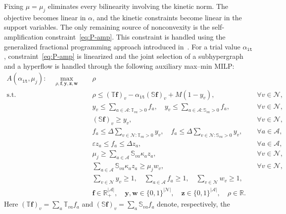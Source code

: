 \documentclass[a4paper,11pt,reqno]{amsart}
\begin{document}
Fixing $\mu=\mu_j$ eliminates every bilinearity involving the kinetic norm.
The objective becomes linear in $\alpha$, and the kinetic constraints become
linear in the support variables. The only remaining source of nonconvexity is
the self-amplification constraint~\eqref{eq:P-amp}. This constraint is handled
using the generalized fractional programming approach introduced
in~\cite{crouzeix1985,gonzalez2024maf}. For a
trial value $\alpha_{\texttt{it}}$, constraint~\eqref{eq:P-amp} is linearized
and the joint selection of a subhypergraph and a hyperflow is handled through
the following auxiliary max--min MILP:
\begin{align}
  A(\alpha_{\texttt{it}},\mu_j):\quad
  \max_{\rho,\mathbf f,\mathbf y,\mathbf z,\mathbf w}\quad
  & \rho
    \label{eq:milp-aux}\\
  \text{s.t.}\quad
  & \rho \le
    (\mathbb T\mathbf f)_v
    -\alpha_{\texttt{it}}(\mathbb S\mathbf f)_v
    +M(1-y_v),
    && \forall v\in\mathcal N,
    \label{eq:aux-maximin}\\[1pt]
  & y_v \le
    \sum_{a\in\mathcal A:\mathbb T_{va}>0} f_a,\quad
    y_v \le
    \sum_{a\in\mathcal A:\mathbb S_{va}>0} f_a,
    && \forall v\in\mathcal N,
    \nonumber\\[1pt]
  & (\mathbb S\mathbf f)_v \ge y_v,
    && \forall v\in\mathcal N,
    \nonumber\\[1pt]
  & f_a \le
    \Delta\sum_{v\in\mathcal N:\mathbb T_{va}>0} y_v,\quad
    f_a \le
    \Delta\sum_{v\in\mathcal N:\mathbb S_{va}>0} y_v,
    && \forall a\in\mathcal A,
    \nonumber\\[1pt]
  & \varepsilon z_a \le f_a \le \Delta z_a,
    && \forall a\in\mathcal A,
    \nonumber\\[1pt]
  & \mu_j \ge
    \sum_{a\in\mathcal A}\mathbb S_{va}\kappa_a z_a,
    && \forall v\in\mathcal N,
    \nonumber\\[1pt]
  & \sum_{a\in\mathcal A}\mathbb S_{va}\kappa_a z_a
    \ge \mu_j w_v,
    && \forall v\in\mathcal N,
    \nonumber\\[1pt]
  & \sum_{v\in\mathcal N} y_v \ge 1,\quad
    \sum_{a\in\mathcal A} f_a \ge 1,\quad
    \sum_{v\in\mathcal N} w_v \ge 1,
    \nonumber\\[1pt]
  & \mathbf f\in\mathbb R_+^{|\mathcal A|},\quad
    \mathbf y,\mathbf w\in\{0,1\}^{|\mathcal N|},\quad
    \mathbf z\in\{0,1\}^{|\mathcal A|},\quad
    \rho\in\mathbb R.
    \nonumber
\end{align}
Here $(\mathbb T\mathbf f)_v=\sum_a\mathbb T_{va}f_a$ and
$(\mathbb S\mathbf f)_v=\sum_a\mathbb S_{va}f_a$ denote, respectively, the
\end{document}
